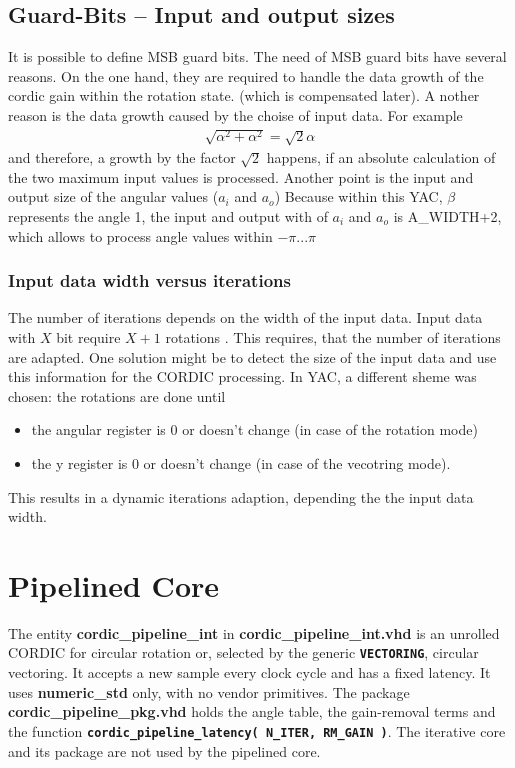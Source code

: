 \documentclass[a4paper, 12pt, notitlepage]{report}
\newcommand{\file}[1]{\textbf{#1}}
\newcommand{\signal}[1]{{\textbf{\tt#1}}}
\begin{document}
\section{Guard-Bits -- Input and output sizes}
It is possible to define MSB guard bits.
The need of MSB guard bits have several reasons. On the one hand,
they are required to handle the data growth of the cordic gain within the rotation state.
(which is compensated later). A nother reason is the data growth caused by the choise of
input data. For example 
\begin{eqnarray}
   \sqrt{ \alpha^2 + \alpha^2 } = \sqrt{2} \alpha
\end{eqnarray}
and therefore, a growth by the factor $\sqrt{2}$ happens, if an absolute calculation
of the two maximum input values is processed.\newline
\newline
Another point is the input and output size of the angular values ($a_i$ and $a_o$)
Because within this YAC, $\beta$ represents the angle 1, the input and output with
of $a_i$ and $a_o$ is A\_WIDTH+2, which allows to process angle values within
$-\pi ... \pi$


\subsection{Input data width versus iterations}
The number of iterations depends on the width of the input data. 
Input data with $X$ bit require $X+1$ rotations \cite{dawid}.
This requires, that the number of iterations are adapted. One solution might
be to detect the size of the input data and use this information for the CORDIC processing.
In YAC, a different sheme was chosen: the rotations are done until 
\begin{itemize}
   \item the angular register is 0 or doesn't change (in case of the rotation mode) 
   \item the y register is 0 or doesn't change (in case of the vecotring mode).
\end{itemize}
This results in a dynamic iterations adaption, depending the the input data width.

\chapter{Pipelined Core}
\label{chap:pipeline}
\sloppy

The entity \file{cordic\_pipeline\_int} in \file{cordic\_pipeline\_int.vhd} is an unrolled
CORDIC for circular rotation or, selected by the generic \signal{VECTORING}, circular vectoring. It accepts a new sample every clock cycle and has a fixed
latency. It uses \file{numeric\_std} only, with no vendor primitives. The package
\file{cordic\_pipeline\_pkg.vhd} holds the angle table, the gain-removal terms and the
function \signal{cordic\_pipeline\_latency( N\_ITER, RM\_GAIN )}.
The iterative core and its package are not used by the pipelined core.
\end{document}
